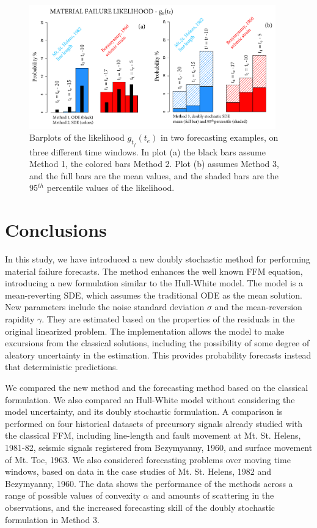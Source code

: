 \documentclass{article}
\begin{document}
\begin{figure}[H]
\centering
\includegraphics[width=0.95\textwidth]{Fig16_plus.png}
\caption{Barplots of the likelihood $g_{t_f}(t_e)$ in two forecasting examples, on three different time windows. In plot (a) the black bars assume Method 1, the colored bars Method 2. Plot (b) assumes Method 3, and the full bars are the mean values, and the shaded bars are the 95$^{th}$ percentile values of the likelihood.}
\label{Fig16}
\end{figure}

\section{Conclusions}
In this study, we have introduced a new doubly stochastic method for performing material failure forecasts. The method enhances the well known FFM equation, introducing a new formulation similar to the Hull-White model. The model is a mean-reverting SDE, which assumes the traditional ODE as the mean solution. New parameters include the noise standard deviation $\sigma$ and the mean-reversion rapidity $\gamma$. They are estimated based on the properties of the residuals in the original linearized problem. The implementation allows the model to make excursions from the classical solutions, including the possibility of some degree of aleatory uncertainty in the estimation. This provides probability forecasts instead that deterministic predictions.

We compared the new method and the forecasting method based on the classical formulation. We also compared an Hull-White model without considering the model uncertainty, and its doubly stochastic formulation. A comparison is performed on four historical datasets of precursory signals already studied with the classical FFM, including line-length and fault movement at Mt. St. Helens, 1981-82, seismic signals registered from Bezymyanny, 1960, and surface movement of Mt. Toc, 1963. We also considered forecasting problems over moving time windows, based on data in the case studies of Mt. St. Helens, 1982 and Bezymyanny, 1960. The data shows the performance of the methods across a range of possible values of convexity $\alpha$ and amounts of scattering in the observations, and the increased forecasting skill of the doubly stochastic formulation in Method 3.
\end{document}

